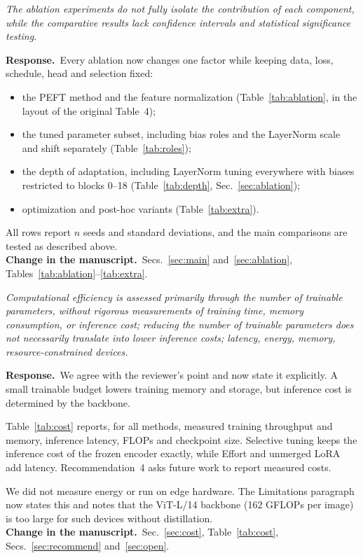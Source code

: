 \documentclass[11pt]{article}
\newenvironment{comment}{\par\medskip\noindent\begin{minipage}{\linewidth}\color{black!70}\itshape}{\end{minipage}\par\smallskip}
\newcommand{\resp}{\noindent\textbf{Response.}~}
\newcommand{\change}{\noindent\textbf{Change in the manuscript.}~}
\begin{document}
\begin{comment}
The ablation experiments do not fully isolate the contribution of each component, while the comparative results lack confidence intervals and statistical significance testing.
\end{comment}
\resp Every ablation now changes one factor while keeping data, loss, schedule, head and selection fixed:
\begin{itemize}
\item the PEFT method and the feature normalization (Table~\ref{tab:ablation}, in the layout of the original Table~4);
\item the tuned parameter subset, including bias roles and the LayerNorm scale and shift separately (Table~\ref{tab:roles});
\item the depth of adaptation, including LayerNorm tuning everywhere with biases restricted to blocks 0--18 (Table~\ref{tab:depth}, Sec.~\ref{sec:ablation});
\item optimization and post-hoc variants (Table~\ref{tab:extra}).
\end{itemize}
All rows report $n$ seeds and standard deviations, and the main comparisons are tested as described above.\\
\change Secs.~\ref{sec:main} and~\ref{sec:ablation}, Tables~\ref{tab:ablation}--\ref{tab:extra}.

\begin{comment}
Computational efficiency is assessed primarily through the number of trainable parameters, without rigorous measurements of training time, memory consumption, or inference cost; reducing the number of trainable parameters does not necessarily translate into lower inference costs; latency, energy, memory, resource-constrained devices.
\end{comment}
\resp We agree with the reviewer's point and now state it explicitly. A small trainable budget lowers training memory and storage, but inference cost is determined by the backbone.

Table~\ref{tab:cost} reports, for all methods, measured training throughput and memory, inference latency, FLOPs and checkpoint size. Selective tuning keeps the inference cost of the frozen encoder exactly, while Effort and unmerged LoRA add latency. Recommendation~4 asks future work to report measured costs.

We did not measure energy or run on edge hardware. The Limitations paragraph now states this and notes that the ViT-L/14 backbone (162 GFLOPs per image) is too large for such devices without distillation.\\
\change Sec.~\ref{sec:cost}, Table~\ref{tab:cost}, Secs.~\ref{sec:recommend} and~\ref{sec:open}.
\end{document}
